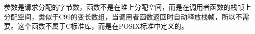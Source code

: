 

参数是请求分配的字节数，函数不是在堆上分配空间，而是在调用者函数的栈帧上分配空间，类似于C99的变长数组，当调用者函数返回时自动释放栈帧，所以不需要。这个函数不属于C标准库，而是在POSIX标准中定义的。

